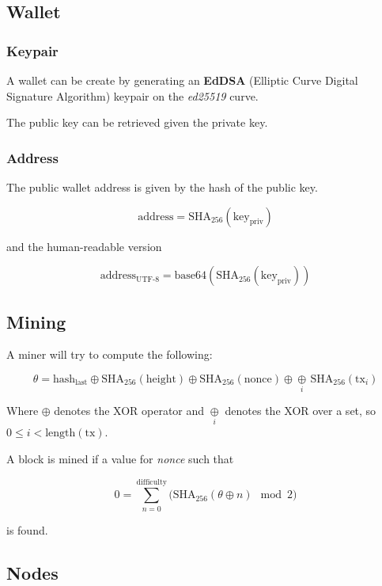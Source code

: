 \documentclass[../documentation.tex]{subfiles}
\begin{document}
\pagebreak

\subsection{Wallet}

\subsubsection{Keypair}

A wallet can be create by generating an \textbf{EdDSA}
(Elliptic Curve Digital Signature Algorithm) keypair
on the \textit{ed25519} curve.

The public key can be retrieved given the private key.

\subsubsection{Address}

The public wallet address is given by the hash of the public key.

\[
    \text{address}=\text{SHA}_{256}(\text{key}_\text{priv})
\]

and the human-readable version

\[
    \text{address}_\text{UTF-8}=\text{base64}(\text{SHA}_{256}(\text{key}_\text{priv}))
\]

\subsection{Mining}

A miner will try to compute the following:

\[
    \theta =
    \text{hash}_\text{last}
    \oplus
    \text{SHA}_{256}(\text{height})
    \oplus
    \text{SHA}_{256}(\text{nonce})
    \oplus
    \underset{i}{\oplus}\,
    \text{SHA}_{256}(\text{tx}_i)
\]

Where \(\oplus\) denotes the XOR operator and 
\(\underset{i}{\oplus}\) denotes the XOR over a set,
so \(0 \leq i < \text{length}(\text{tx})\).

A block is mined if a value for \textit{nonce} such that

\[
    0 = \sum_{n=0}^{\text{difficulty}}
    \Big(
        \text{SHA}_{256}(\theta \oplus n) \mod{2}
    \Big)
\]

is found.

\subsection{Nodes}
\end{document}
